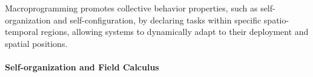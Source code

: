 \documentclass[12pt, a4paper]{article}
\begin{document}
Macroprogramming promotes collective behavior properties, such as self-organization and self-configuration, by declaring
tasks within specific spatio-temporal regions, allowing systems to dynamically adapt to their deployment and spatial positions.

%
%
%
%
%
%

\paragraph{Self-organization and Field Calculus}
\end{document}
